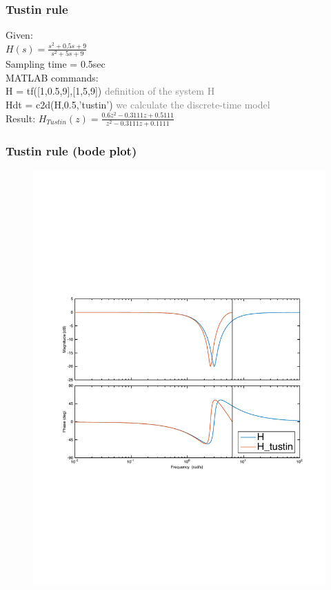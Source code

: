 \begin{frame}
	\frametitle{Tustin rule}
	\begin{example}
		Given:\\
		$H(s) = \frac{s^{2} + 0.5s + 9}{s^{2} + 5s + 9}$\\
		Sampling time = 0.5sec\\
		\vspace{1em}
		MATLAB commands:\\
		
		H = tf([1,0.5,9],[1,5,9])	\textcolor{gray}{definition of the system H} \\
		Hdt = c2d(H,0.5,'tustin')	\textcolor{gray}{we calculate the discrete-time model}\\
		\vspace{1em}
		Result: 
		$H_{Tustin}(z) = \frac{0.6z^{2} - 0.3111z + 0.5111}{z^{2} -  0.3111z + 0.1111}$
	\end{example}
\end{frame}

\begin{frame}
	\frametitle{Tustin rule (bode plot)}
	\vspace{-0.7em}
	\begin{figure}
		\centering
		\includegraphics[width=0.9\linewidth]{distortion_bode2}
	\end{figure}
\end{frame}

